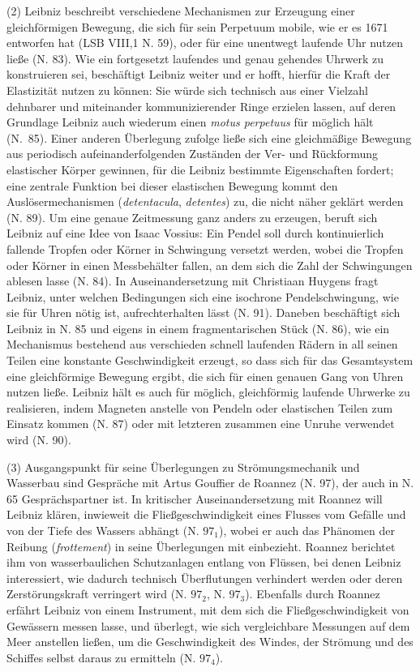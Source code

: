 (2) Leibniz beschreibt verschiedene Mechanismen zur Erzeugung einer gleichförmigen Bewegung, die sich für sein Perpetuum mobile, wie er es 1671 entworfen hat (LSB VIII,1 N. 59), oder für eine unentwegt laufende Uhr nutzen lie{\ss}e (N. 83). Wie ein fortgesetzt laufendes und genau gehendes Uhrwerk zu konstruieren sei, beschäftigt Leibniz weiter und er hofft, hierfür die Kraft der Elastizität nutzen zu können: Sie würde sich technisch aus einer Vielzahl dehnbarer und miteinander kommunizierender Ringe erzielen lassen, auf deren Grundlage Leibniz auch wiederum einen \textit{motus perpetuus} für möglich hält (N.~85). Einer anderen Überlegung zufolge lie{\ss}e sich eine gleichmä{\ss}ige Bewegung aus periodisch aufeinanderfolgenden Zuständen der Ver- und Rückformung elastischer Körper gewinnen, für die Leibniz bestimmte Eigenschaften fordert; eine zentrale Funktion bei dieser elastischen Bewegung kommt den Auslösermechanismen (\textit{detentacula}, \textit{detentes}) zu, die nicht näher geklärt werden (N. 89). Um eine genaue Zeitmessung ganz anders zu erzeugen, beruft sich Leibniz auf eine Idee von Isaac Vossius: Ein Pendel soll durch kontinuierlich fallende Tropfen oder Körner in Schwingung versetzt werden, wobei die Tropfen oder Körner in einen Messbehälter fallen, an dem sich die Zahl der Schwingungen ablesen lasse (N. 84). In Auseinandersetzung mit Christiaan Huygens fragt Leibniz, unter welchen Bedingungen sich eine isochrone Pendelschwingung, wie sie für Uhren nötig ist, aufrechterhalten lässt (N. 91). Daneben beschäftigt sich Leibniz in N. 85 und eigens in einem fragmentarischen Stück (N. 86), wie ein Mechanismus bestehend aus verschieden schnell laufenden Rädern in all seinen Teilen eine konstante Geschwindigkeit erzeugt, so dass sich für das Gesamtsystem eine gleichförmige Bewegung ergibt, die sich für einen genauen Gang von Uhren nutzen lie{\ss}e. Leibniz hält es auch für möglich, gleichförmig laufende Uhrwerke zu realisieren, indem Magneten anstelle von Pendeln oder elastischen Teilen zum Einsatz kommen (N. 87) oder mit letzteren zusammen eine Unruhe verwendet wird (N. 90).
\par
(3) Ausgangspunkt für seine Überlegungen zu Strömungsmechanik und Wasserbau sind Gespräche mit Artus Gouffier de Roannez (N. 97), der auch in N. 65 Gesprächspartner ist. In kritischer Auseinandersetzung mit Roannez will Leibniz klären, inwieweit die Flie{\ss}geschwindigkeit eines Flusses vom Gefälle und von der Tiefe des Wassers abhängt (N. $97_1$), wobei er auch das Phänomen der Reibung (\textit{frottement}) in seine Überlegungen mit einbezieht. Roannez berichtet ihm von wasserbaulichen Schutzanlagen entlang von Flüssen, bei denen Leibniz interessiert, wie dadurch technisch Überflutungen verhindert werden oder deren Zerstörungskraft verringert wird (N. $97_2$, N. $97_3$). Ebenfalls durch Roannez erfährt Leibniz von einem Instrument, mit dem sich die Flie{\ss}geschwindigkeit von Gewässern messen lasse, und überlegt, wie sich vergleichbare Messungen auf dem Meer anstellen lie{\ss}en, um die Geschwindigkeit des Windes, der Strömung und des Schiffes selbst daraus zu ermitteln (N. $97_4$).
